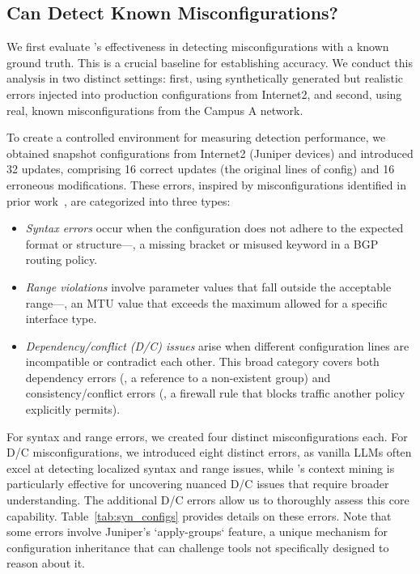 \subsection{Can \sysname{} Detect Known Misconfigurations?}

We first evaluate \sysname{}'s effectiveness in detecting misconfigurations with a known ground truth. This is a crucial baseline for establishing accuracy. We conduct this analysis in two distinct settings: first, using synthetically generated but realistic errors injected into production configurations from Internet2, and second, using real, known misconfigurations from the Campus A network.

To create a controlled environment for measuring detection performance, we obtained snapshot configurations from Internet2 (Juniper devices) and introduced 32 updates, comprising 16 correct updates (the original lines of config) and 16 erroneous modifications. These errors, inspired by misconfigurations identified in prior work~\cite{some_prior_work}, are categorized into three types:

\begin{itemize}
    \item \textit{Syntax errors} occur when the configuration does not adhere to the expected format or structure---\eg, a missing bracket or misused keyword in a BGP routing policy.
    \item \textit{Range violations} involve parameter values that fall outside the acceptable range---\eg, an MTU value that exceeds the maximum allowed for a specific interface type.
    \item \textit{Dependency/conflict (D/C) issues} arise when different configuration lines are incompatible or contradict each other. This broad category covers both dependency errors (\eg, a reference to a non-existent group) and consistency/conflict errors (\eg, a firewall rule that blocks traffic another policy explicitly permits).
\end{itemize}

For syntax and range errors, we created four distinct misconfigurations each. For D/C misconfigurations, we introduced eight distinct errors, as vanilla LLMs often excel at detecting localized syntax and range issues, while \sysname{}’s context mining is particularly effective for uncovering nuanced D/C issues that require broader understanding. The additional D/C errors allow us to thoroughly assess this core capability. Table~\ref{tab:syn_configs} provides details on these errors. Note that some errors involve Juniper's `apply-groups` feature, a unique mechanism for configuration inheritance that can challenge tools not specifically designed to reason about it.


